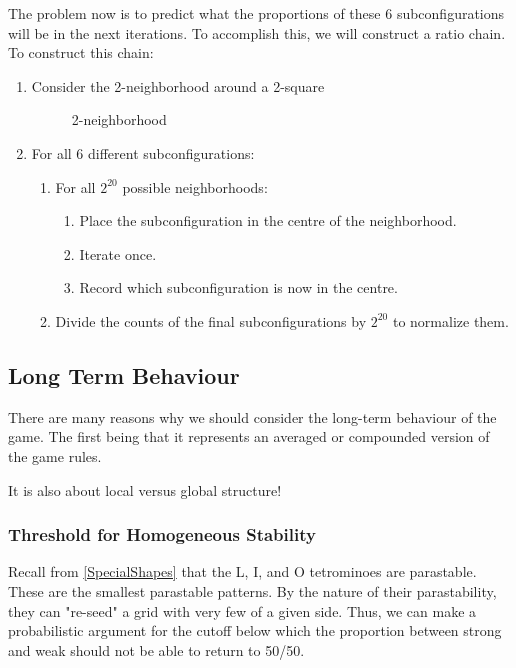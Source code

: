 \documentclass[12pt]{article}
\theoremstyle{definition}
\theoremstyle{remark}
\theoremstyle{remark}
\begin{document}
\par
The problem now is to predict what the proportions of these 6 subconfigurations will be in the next iterations. To accomplish this, we will construct a ratio chain. To construct this chain:
\begin{enumerate}
  \item{} Consider the 2-neighborhood around a 2-square
  \begin{figure}
    \caption{2-neighborhood}
  \end{figure}
  \item{} For all 6 different subconfigurations:
  \begin{enumerate}
    \item{} For all $2^{20}$ possible neighborhoods:
    \begin{enumerate}
      \item{} Place the subconfiguration in the centre of the neighborhood.
      \item{} Iterate once.
      \item{} Record which subconfiguration is now in the centre.
    \end{enumerate}
    \item{} Divide the counts of the final subconfigurations by $2^{20}$ to normalize them.
  \end{enumerate}
  
\end{enumerate}

\subsection{Long Term Behaviour}
\label{LongTermB}
\par
There are many reasons why we should consider the long-term behaviour of the game. The first being that it represents an averaged or compounded version of the game rules. 
\par
It is also about local versus global structure!


\subsubsection{Threshold for Homogeneous Stability} \label{HomoStability}
\par
Recall from \ref{SpecialShapes} that the L, I, and O tetrominoes are parastable. These are the smallest parastable patterns. By the nature of their parastability, they can "re-seed" a grid with very few of a given side. Thus, we can make a probabilistic argument for the cutoff below which the proportion between strong and weak should not be able to return to 50/50.
\end{document}
